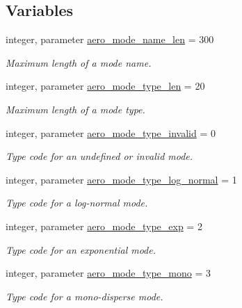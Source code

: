 \subsection*{Variables}
\begin{DoxyCompactItemize}
\item 
integer, parameter \mbox{\hyperlink{namespacepmc__aero__mode_ae84b8139739f7f4a21f52621b68f8b3b}{aero\+\_\+mode\+\_\+name\+\_\+len}} = 300
\begin{DoxyCompactList}\small\item\em Maximum length of a mode name. \end{DoxyCompactList}\item 
integer, parameter \mbox{\hyperlink{namespacepmc__aero__mode_a267ddc1551b2f71a22191d1c14577227}{aero\+\_\+mode\+\_\+type\+\_\+len}} = 20
\begin{DoxyCompactList}\small\item\em Maximum length of a mode type. \end{DoxyCompactList}\item 
integer, parameter \mbox{\hyperlink{namespacepmc__aero__mode_ae914213ae545288187869448e9a7c9c8}{aero\+\_\+mode\+\_\+type\+\_\+invalid}} = 0
\begin{DoxyCompactList}\small\item\em Type code for an undefined or invalid mode. \end{DoxyCompactList}\item 
integer, parameter \mbox{\hyperlink{namespacepmc__aero__mode_a936200d0b3116d7e58d32e7b43ac4789}{aero\+\_\+mode\+\_\+type\+\_\+log\+\_\+normal}} = 1
\begin{DoxyCompactList}\small\item\em Type code for a log-\/normal mode. \end{DoxyCompactList}\item 
integer, parameter \mbox{\hyperlink{namespacepmc__aero__mode_af8ac2864bbbcbbb395efddac6ae2ac7f}{aero\+\_\+mode\+\_\+type\+\_\+exp}} = 2
\begin{DoxyCompactList}\small\item\em Type code for an exponential mode. \end{DoxyCompactList}\item 
integer, parameter \mbox{\hyperlink{namespacepmc__aero__mode_a2a5e08b4bbed0947335c38a0a3791f6c}{aero\+\_\+mode\+\_\+type\+\_\+mono}} = 3
\begin{DoxyCompactList}\small\item\em Type code for a mono-\/disperse mode. \end{DoxyCompactList}\item 

\end{DoxyCompactItemize}
